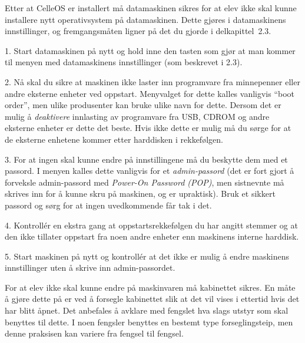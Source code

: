 
Etter at CelleOS er installert m\aa{} datamaskinen sikres for at elev ikke skal kunne installere nytt operativsystem p\aa{} datamaskinen. Dette gj\o res i datamaskinens innstillinger, og fremgangsm\aa ten ligner p\aa{} det du gjorde i delkapittel~2.3. 
\item{1.} Start datamaskinen p\aa{} nytt og hold inne den tasten som gj\o r at man kommer til menyen med datamaskinens innstillinger (som beskrevet i 2.3).
\item{2.} N\aa{} skal du sikre at maskinen ikke laster inn programvare fra minnepenner eller andre eksterne enheter ved oppstart. Menyvalget for dette kalles vanligvis ``boot order'', men ulike produsenter kan bruke ulike navn for dette. Dersom det er mulig \aa{} {\it deaktivere} innlasting av programvare fra USB, CDROM og andre eksterne enheter er dette det beste. Hvis ikke dette er mulig m\aa{} du s\o rge for at de eksterne enhetene kommer etter harddisken i rekkef\o lgen. 
\item{3.} For at ingen skal kunne endre p\aa{} innstillingene m\aa{} du beskytte dem med et passord. I menyen kalles dette vanligvis for et {\it admin-passord} (det er fort gjort \aa{} forveksle admin-passord med {\it Power-On Password (POP)}, men sistnevnte m\aa{} skrives inn for \aa{} kunne skru p\aa{} maskinen, og er upraktisk). Bruk et sikkert passord og s\o rg for at ingen uvedkommende f\aa r tak i det.
\item{4.} Kontroll\'er en ekstra gang at oppstartsrekkef\o lgen du har angitt stemmer og at den ikke tillater oppstart fra noen andre enheter enn maskinens interne harddisk.
\item{5.} Start maskinen p\aa{} nytt og kontroll\'er at det ikke er mulig \aa{} endre maskinens innstillinger uten \aa{} skrive inn admin-passordet.


For at elev ikke skal kunne endre p\aa{} maskinvaren m\aa{} kabinettet sikres. En m\aa te \aa{} gj\o re dette p\aa{} er ved \aa{} forsegle kabinettet slik at det vil vises i ettertid hvis det har blitt \aa pnet. Det anbefales \aa{} avklare med fengslet hva slags utstyr som skal benyttes til dette. I noen fengsler benyttes en bestemt type forseglingsteip, men denne praksisen kan variere fra fengsel til fengsel.


